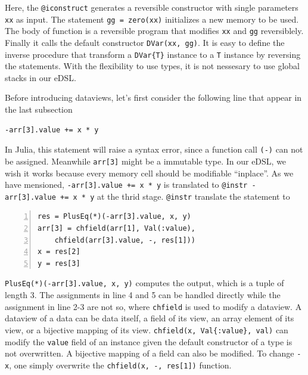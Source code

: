 \documentclass[aps,twocolumn,longbibliography,english,superscriptaddress,prr]{revtex4-1}
\newcommand{\<}{\langle}
\renewcommand{\>}{\rangle}
\theoremstyle{definition}\newtheorem{definition}{\textit{Definition}}
\begin{document}
Here, the \texttt{@iconstruct} generates a reversible constructor with single parameters \texttt{xx} as input. The statement \texttt{gg = zero(xx)} initializes a new memory to be used. The body of function is a reversible program that modifies \texttt{xx} and \texttt{gg} reversiblely. Finally it calls the default constructor \texttt{DVar(xx, gg)}. It is easy to define the inverse procedure that transform a \texttt{DVar\{T\}} instance to a \texttt{T} instance by reversing the statements. With the flexibility to use types, it is not nessesary to use global stacks in our eDSL.

Before introducing dataviews, let's first consider the following line that appear in the last subsection

\begin{minipage}{.44\textwidth}
\begin{lstlisting}
-arr[3].value += x * y
\end{lstlisting}
\end{minipage}

In Julia, this statement will raise a syntax error, since a function call \texttt{(-)} can not be assigned.
Meanwhile \texttt{arr[3]} might be a immutable type.
In our eDSL, we wish it works because every memory cell should be modifiable ``inplace''.
As we have mensioned, \texttt{-arr[3].value += x * y} is translated to \texttt{@instr -arr[3].value += x * y} at the thrid stage.
\texttt{@instr} translate the statement to

\begin{minipage}{.44\textwidth}
    \begin{lstlisting}[numberstyle=\scriptsize\color{codegray},numbers=left,numbersep=8pt]
res = PlusEq(*)(-arr[3].value, x, y)
arr[3] = chfield(arr[1], Val(:value), 
    chfield(arr[3].value, -, res[1]))
x = res[2]
y = res[3]
\end{lstlisting}
\end{minipage}

\texttt{PlusEq(*)(-arr[3].value, x, y)} computes the output, which is a tuple of length $3$.
The assignments in line 4 and 5 can be handled directly while the assignment in line 2-3 are not so, where \texttt{chfield} is used to modify a dataview.
A dataview of a data can be data itself, a field of its view, an array element of its view, or a bijective mapping of its view.
\texttt{chfield(x, Val\{:value\}, val)} can modify the \texttt{value} field of an instance given the default constructor of a type is not overwritten.
A bijective mapping of a field can also be modified. To change \texttt{-x}, one simply overwrite the \texttt{chfield(x, -, res[1])} function.
\end{document}
